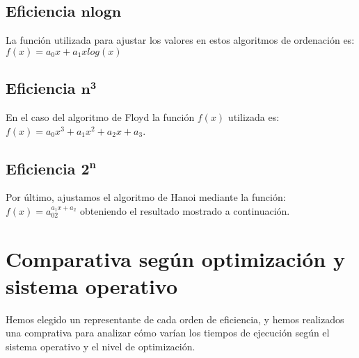 \documentclass[11pt]{article}
\begin{document}
\subsection*{Eficiencia $\boldsymbol{n log n}$}

La función utilizada para ajustar los valores en estos algoritmos de ordenación es: $f(x) = a_0x + a_1xlog(x)$


\begin{adjustbox}{center}
	\fontsize{6.8pt}{7.2}\selectfont
	\resizebox*{12cm}{!}{
				
			}
\end{adjustbox}



\begin{adjustbox}{center}
	\fontsize{6.8pt}{7.2}\selectfont
	\resizebox*{12cm}{!}{
				
			}
\end{adjustbox}

\begin{adjustbox}{center}
	\fontsize{6.8pt}{7.2}\selectfont
	\resizebox*{12cm}{!}{
				
			}
\end{adjustbox}

\subsection*{Eficiencia $\boldsymbol{n^3}$}

En el caso del algoritmo de Floyd la función $f(x)$ utilizada es: $f(x) = a_0x^3 + a_1x^2 + a_2x + a_3$.

\begin{adjustbox}{center}
	\fontsize{8pt}{7.2}\selectfont
	\resizebox*{13cm}{!}{
				
			}
\end{adjustbox}

\subsection*{Eficiencia $\boldsymbol{2^n}$}

Por último, ajustamos el algoritmo de Hanoi mediante la función: $f(x) = a_02^{a_{1}x + a_2}$ obteniendo el resultado mostrado a continuación.
 
\begin{center}
	
\end{center}


\section*{Comparativa según optimización y sistema operativo}
Hemos elegido un representante de cada orden de eficiencia, y hemos realizados una comprativa para analizar cómo varían los tiempos de ejecución según el sistema operativo y el nivel de optimización.\\
\end{document}
